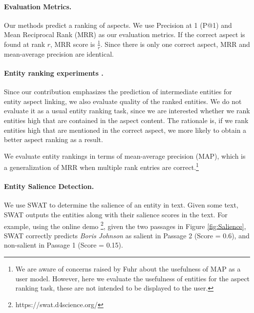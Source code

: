 \paragraph{\textbf{Evaluation Metrics.}}
Our methods predict a ranking of aspects. We use Precision at 1 (P@1) and Mean Reciprocal Rank (MRR) as our evaluation metrics. If the correct aspect is found at rank $r$, MRR score is $\frac{1}{r}$. Since there is only one correct aspect, MRR and mean-average precision are identical.


\paragraph{\textbf{Entity ranking experiments .}}
Since our contribution emphasizes the prediction of intermediate entities for entity aspect linking, we also evaluate quality of the ranked entities. We do not evaluate it as a usual entity ranking task, since we are interested whether we rank entities high that are contained in the aspect content. The rationale is, if we rank entities high that are mentioned in the correct aspect, we more likely to obtain a better aspect ranking as a result. 

We evaluate entity rankings in terms of mean-average precision (MAP), which is a generalization of MRR when multiple rank entries are correct.\footnote{We are aware of concerns raised by Fuhr \cite{fuhr2018some} about the usefulness of MAP as a user model. However, here we evaluate the usefulness of entities for the aspect ranking task, these are not intended to be displayed to the user.}


\paragraph{\textbf{Entity Salience Detection.}}
We use SWAT \cite{swat}  to determine the salience of an entity in text. Given some text, SWAT outputs the entities along with their salience scores in the text. For example, using the online demo \footnote{https://swat.d4science.org/}, given the two passages in Figure \ref{fig:Salience}, SWAT correctly predicts \textit{Boris Johnson} as salient in Passage 2 (Score = 0.6), and non-salient in Passage 1 (Score = 0.15). 

